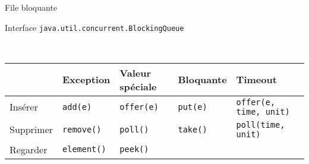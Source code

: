 
\begingroup

\begin{frame}{File bloquante}

\vfill
  \begin{exampleblock}{Interface \lstinline{java.util.concurrent.BlockingQueue}}~

\vfill

~\hspace{-5mm}\begin{tabular}{|l|l|l|l|l|}
      \hline
      & Exception & Valeur spéciale & Bloquante & Timeout\\
      \hline
      Insérer & \lstinline+add(e)+ & \lstinline+offer(e)+ & \lstinline+put(e)+ & \lstinline+offer(e, time, unit)+  \\
      \hline
      Supprimer & \lstinline+remove()+ & \lstinline+poll()+ & \lstinline+take()+ & \lstinline+poll(time, unit)+ \\
      \hline
      Regarder & \lstinline+element()+ & \lstinline+peek()+ &  &  \\
      \hline
    \end{tabular}
  \end{exampleblock}

\vfill
\end{frame}

\endgroup
\endinput
